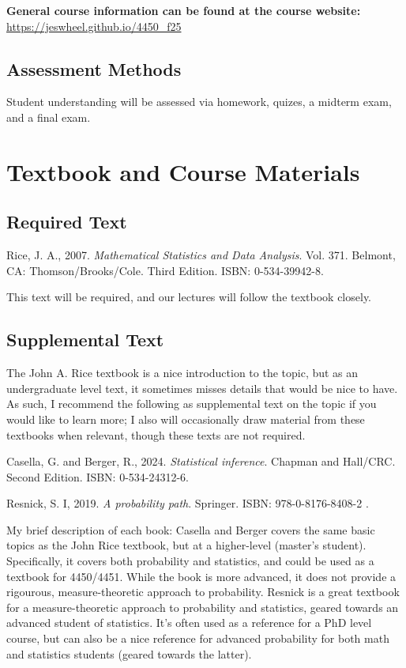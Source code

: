 \documentclass[11pt]{article}\usepackage[]{graphicx}\usepackage[]{xcolor}
\begin{document}
\textbf{General course information can be found at the course website:} \url{https://jeswheel.github.io/4450\_f25}

\subsection{Assessment Methods}

Student understanding will be assessed via homework, quizes, a midterm exam, and a final exam.

\section{Textbook and Course Materials}

\subsection{Required Text}
\begin{hangparas}{0.25in}{1}
Rice, J. A., 2007. \emph{Mathematical Statistics and Data Analysis}. Vol. 371. Belmont, CA: Thomson/Brooks/Cole. Third Edition. ISBN: 0-534-39942-8.
\end{hangparas}

This text will be required, and our lectures will follow the textbook closely.

\subsection{Supplemental Text}

The John A. Rice textbook is a nice introduction to the topic, but as an undergraduate level text, it sometimes misses details that would be nice to have. 
As such, I recommend the following as supplemental text on the topic if you would like to learn more; I also will occasionally draw material from these textbooks when relevant, though these texts are not required.

\begin{hangparas}{0.25in}{1}
Casella, G. and Berger, R., 2024. \emph{Statistical inference}. Chapman and Hall/CRC. Second Edition. ISBN: 0-534-24312-6.
\end{hangparas}

\begin{hangparas}{0.25in}{1}
Resnick, S. I, 2019. \emph{A probability path}. Springer. ISBN: 978-0-8176-8408-2
.
\end{hangparas}

My brief description of each book: Casella and Berger covers the same basic topics as the John Rice textbook, but at a higher-level (master's student). Specifically, it covers both probability and statistics, and could be used as a textbook for 4450/4451. While the book is more advanced, it does not provide a rigourous, measure-theoretic approach to probability.
Resnick is a great textbook for a measure-theoretic approach to probability and statistics, geared towards an advanced student of statistics. It's often used as a reference for a PhD level course, but can also be a nice reference for advanced probability for both math and statistics students (geared towards the latter).
\end{document}

